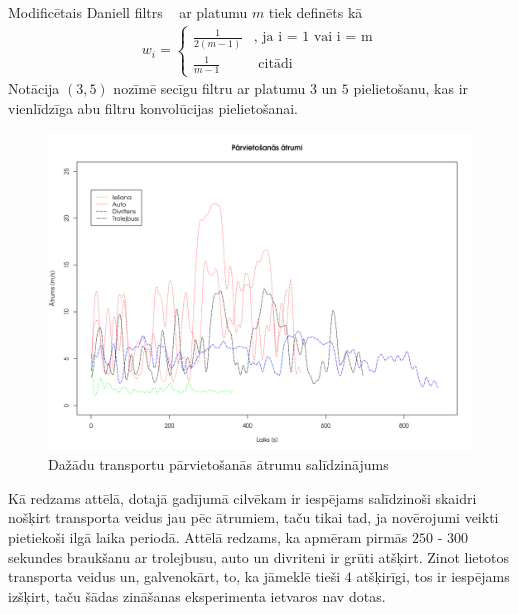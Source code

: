 \documentclass{ludis}
\begin{document}
Modificētais Daniell filtrs ~\cite{daniell1946} ar platumu $m$ tiek definēts kā 
\begin{align*}
  w_i = \begin{cases}
    \frac{1}{2 (m - 1)} &\text{, ja i = 1 vai i = m}\\
    \frac{1}{m - 1} &\text{ citādi}
    \end{cases}
\end{align*}
Notācija $(3, 5)$ nozīmē secīgu filtru ar platumu $3$ un $5$ pielietošanu, kas ir vienlīdzīga
abu filtru konvolūcijas pielietošanai.

\begin{figure}
  \centering
  \includegraphics[scale=0.5]{img/speed_comparison}
  \caption{Dažādu transportu pārvietošanās ātrumu salīdzinājums}
  \label{fig:speed_comparison}
\end{figure}

Kā redzams attēlā, dotajā gadījumā cilvēkam ir iespējams salīdzinoši skaidri nošķirt transporta 
veidus jau pēc ātrumiem, taču tikai tad, ja novērojumi veikti pietiekoši ilgā laika periodā.
Attēlā redzams, ka apmēram pirmās $250$ - $300$ sekundes braukšanu ar trolejbusu, auto un divriteni
ir grūti atšķirt. Zinot lietotos transporta veidus un, galvenokārt, to, ka jāmeklē tieši $4$ 
atšķirīgi, tos ir iespējams izšķirt, taču šādas zināšanas eksperimenta ietvaros nav dotas.
\end{document}

